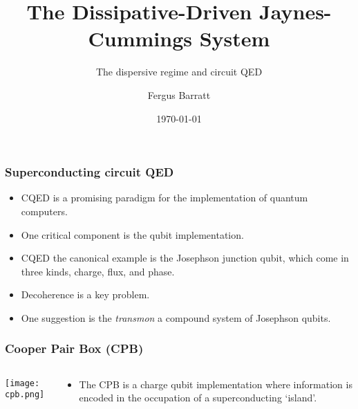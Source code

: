 \documentclass[xetex]{beamer}
\title{The Dissipative-Driven Jaynes-Cummings System}
\subtitle{The dispersive regime and  circuit QED}
\date{\today}
\author{Fergus Barratt}
\begin{document}
\maketitle
\begin{frame}
    \frametitle{Superconducting circuit QED}         
    \begin{itemize}
        \item CQED is a promising paradigm for the implementation of 
                quantum computers. 
        \item One critical component is the qubit implementation.
        \item CQED the canonical example is the Josephson junction 
                qubit, which come in three kinds, charge, flux, and 
                phase. 
        \item Decoherence is a key problem.
        \item One suggestion is the \emph{transmon}
                a compound system of Josephson qubits.
    \end{itemize}
    
\end{frame}
\begin{frame}
    \frametitle{Cooper Pair Box (CPB)}
    \begin{columns}[c]
        \begin{column}{0.4\linewidth}
            \texttt{[image: cpb.png]}
        \end{column}
        \begin{column}{0.6\linewidth}
            \begin{itemize}
                \item The CPB is a charge qubit implementation where 
                    information is encoded in the occupation of a 
                    superconducting `island'.
            \end{itemize}
        \end{column}
    \end{columns}
\end{frame}
\end{document}
